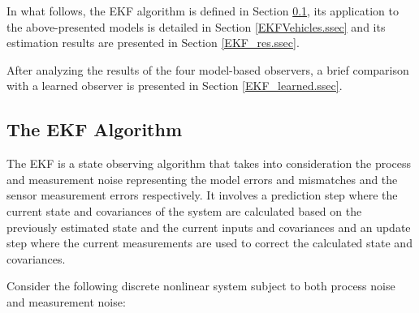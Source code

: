 \documentclass[journal]{IEEEtran}
\begin{document}
In what follows, the EKF algorithm is defined in Section \ref{EKF.ssec}, its application to the above-presented models is detailed in Section \ref{EKFVehicles.ssec} and its estimation results are presented in Section \ref{EKF_res.ssec}.

After analyzing the results of the four model-based observers, a brief comparison with a learned observer is presented in Section \ref{EKF_learned.ssec}.

\subsection{The EKF Algorithm}\label{EKF.ssec}
The EKF is a state observing algorithm that takes into consideration the process and measurement noise representing the model errors and mismatches and the sensor measurement errors respectively. It involves a prediction step where the current state and covariances of the system are calculated based on the previously estimated state and the current inputs and covariances and an update step where the current measurements are used to correct the calculated state and covariances. 

Consider the following discrete nonlinear system subject to both process noise and measurement noise:
\end{document}
